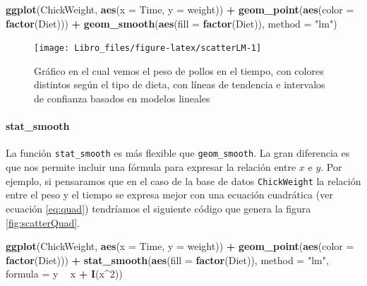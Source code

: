\documentclass[]{book}
\newenvironment{Shaded}{\begin{snugshade}}{\end{snugshade}}
\newcommand{\DataTypeTok}[1]{\textcolor[rgb]{0.13,0.29,0.53}{#1}}
\newcommand{\DecValTok}[1]{\textcolor[rgb]{0.00,0.00,0.81}{#1}}
\newcommand{\KeywordTok}[1]{\textcolor[rgb]{0.13,0.29,0.53}{\textbf{#1}}}
\newcommand{\NormalTok}[1]{#1}
\newcommand{\OperatorTok}[1]{\textcolor[rgb]{0.81,0.36,0.00}{\textbf{#1}}}
\newcommand{\StringTok}[1]{\textcolor[rgb]{0.31,0.60,0.02}{#1}}
\let\oldparagraph\paragraph
\renewcommand{\paragraph}[1]{\oldparagraph{#1}\mbox{}}
\begin{document}
\begin{Shaded}
\begin{Highlighting}[]
\KeywordTok{ggplot}\NormalTok{(ChickWeight, }\KeywordTok{aes}\NormalTok{(}\DataTypeTok{x =}\NormalTok{ Time, }\DataTypeTok{y =}\NormalTok{ weight)) }\OperatorTok{+}\StringTok{ }\KeywordTok{geom_point}\NormalTok{(}\KeywordTok{aes}\NormalTok{(}\DataTypeTok{color =} \KeywordTok{factor}\NormalTok{(Diet))) }\OperatorTok{+}\StringTok{ }
\StringTok{    }\KeywordTok{geom_smooth}\NormalTok{(}\KeywordTok{aes}\NormalTok{(}\DataTypeTok{fill =} \KeywordTok{factor}\NormalTok{(Diet)), }\DataTypeTok{method =} \StringTok{"lm"}\NormalTok{)}
\end{Highlighting}
\end{Shaded}

\begin{figure}

{\centering \texttt{[image: Libro\_files/figure-latex/scatterLM-1]} 

}

\caption{Gráfico en el cual vemos el peso de pollos en el tiempo, con colores distintos según el tipo de dieta, con líneas de tendencia e intervalos de confianza basados en modelos lineales}\label{fig:scatterLM}
\end{figure}

\hypertarget{stat_smooth}{%
\paragraph{stat\_smooth}\label{stat_smooth}}

La función \texttt{stat\_smooth} es más flexible que
\texttt{geom\_smooth}. La gran diferencia es que nos permite incluir una
fórmula para expresar la relación entre \(x\) e \(y\). Por ejemplo, si
pensaramos que en el caso de la base de datos \texttt{ChickWeight} la
relación entre el peso y el tiempo se expresa mejor con una ecuación
cuadrática (ver ecuación \eqref{eq:quad}) tendríamos el siguiente código
que genera la figura \ref{fig:scatterQuad}.

\begin{Shaded}
\begin{Highlighting}[]
\KeywordTok{ggplot}\NormalTok{(ChickWeight, }\KeywordTok{aes}\NormalTok{(}\DataTypeTok{x =}\NormalTok{ Time, }\DataTypeTok{y =}\NormalTok{ weight)) }\OperatorTok{+}\StringTok{ }\KeywordTok{geom_point}\NormalTok{(}\KeywordTok{aes}\NormalTok{(}\DataTypeTok{color =} \KeywordTok{factor}\NormalTok{(Diet))) }\OperatorTok{+}\StringTok{ }
\StringTok{    }\KeywordTok{stat_smooth}\NormalTok{(}\KeywordTok{aes}\NormalTok{(}\DataTypeTok{fill =} \KeywordTok{factor}\NormalTok{(Diet)), }\DataTypeTok{method =} \StringTok{"lm"}\NormalTok{, }\DataTypeTok{formula =}\NormalTok{ y }\OperatorTok{~}\StringTok{ }
\StringTok{        }\NormalTok{x }\OperatorTok{+}\StringTok{ }\KeywordTok{I}\NormalTok{(x}\OperatorTok{^}\DecValTok{2}\NormalTok{))}
\end{Highlighting}
\end{Shaded}
\end{document}
